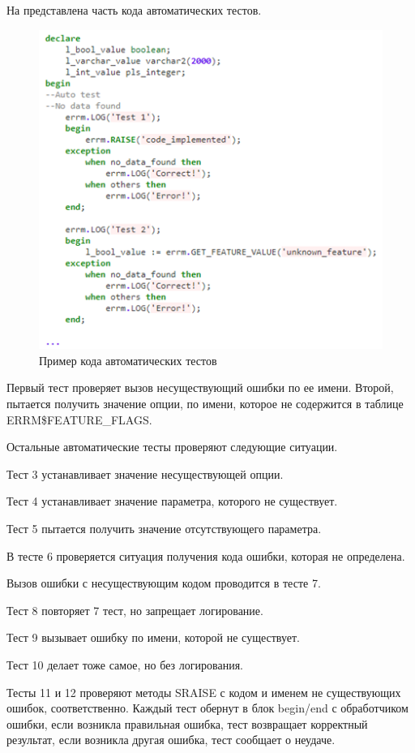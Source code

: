 На  представлена часть кода автоматических тестов. 

\begin{figure}[ht!] 
	\center
	\includegraphics [scale=1] {my_folder/img/c4_auto_test.png}
	\caption{Пример кода автоматических тестов} 
	\label{fig:c4_auto_test}  
\end{figure}
\FloatBarrier

Первый тест проверяет вызов несуществующий ошибки по ее имени. Второй, пытается получить значение опции, по имени, которое не содержится в таблице ERRM\$FEATURE\_FLAGS. 

Остальные автоматические тесты проверяют следующие ситуации.

Тест 3 устанавливает значение несуществующей опции.

Тест 4 устанавливает значение параметра, которого не существует.

Тест 5 пытается получить значение отсутствующего параметра.

В тесте 6 проверяется ситуация получения кода ошибки, которая не определена.

Вызов ошибки с несуществующим кодом проводится в тесте 7.

Тест 8 повторяет 7 тест, но запрещает логирование.

Тест 9 вызывает ошибку по имени, которой не существует.

Тест 10 делает тоже самое, но без логирования.

Тесты 11 и 12 проверяют методы SRAISE с кодом и именем не существующих ошибок, соответственно. 
Каждый тест обернут в блок begin/end с обработчиком ошибки, если возникла правильная ошибка, тест возвращает корректный результат, если возникла другая ошибка, тест сообщает о неудаче. 

